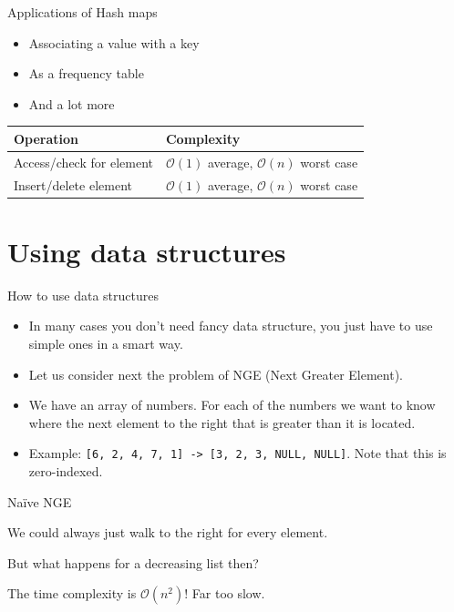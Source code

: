 \documentclass{beamer}
\begin{document}
\begin{frame}[plain]{Applications of Hash maps}
    \begin{itemize}
        \item Associating a value with a key
        \item As a frequency table
        \item And a lot more
    \end{itemize}
    \vspace*{1cm}
    \begin{center}
    \begin{tabular}{l|l}
    Operation & Complexity \\ \hline
    Access/check for element & $\mathcal{O}(1)$ average, $\mathcal{O}(n)$ worst case \\
    Insert/delete element & $\mathcal{O}(1)$ average, $\mathcal{O}(n)$ worst case \\
    \end{tabular}
    \end{center}
\end{frame}



\section*{Using data structures}

\begin{frame}[plain]{How to use data structures}
    \begin{itemize}
        \item In many cases you don't need fancy data structure, you just have to use simple ones in a smart way.
        \item Let us consider next the problem of NGE (Next Greater Element).
        \item We have an array of numbers. For each of the numbers we want to know where the next element to the right that is greater than it is located.
        \item Example: \texttt{[6, 2, 4, 7, 1] -> [3, 2, 3, NULL, NULL]}. Note that this is zero-indexed.
    \end{itemize}
\end{frame}

\begin{frame}[plain]{Naïve NGE}
    \begin{itemize}
        \item We could always just walk to the right for every element. 
         { \item But what happens for a decreasing list then? }
         { \item The time complexity is $\mathcal{O}(n^2)$! Far too slow. }
    \end{itemize}
\end{frame}
\end{document}

